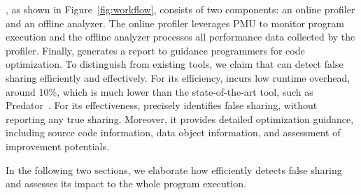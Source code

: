 \Cheetah{}, as shown in Figure~\ref{fig:workflow}, consists of two components: an online profiler and an offline analyzer. The online profiler leverages PMU to monitor program execution and the offline analyzer processes all performance data collected by the profiler. Finally, \cheetah{} generates a report to guidance programmers for code optimization. 
To distinguish \cheetah{} from existing tools, we claim that \cheetah{} can detect false sharing efficiently and effectively. For its efficiency, \cheetah{} incurs low runtime overhead, around 10\%, which is much lower than the state-of-the-art tool, such as Predator~\cite{Predator}. For its effectiveness, \cheetah{} precisely identifies false sharing, without reporting any true sharing. Moreover, it provides detailed optimization guidance, including source code information, data object information, and assessment of improvement potentials.

In the following two sections, we elaborate how \cheetah{} efficiently detects false sharing and assesses its impact to the whole program execution.


